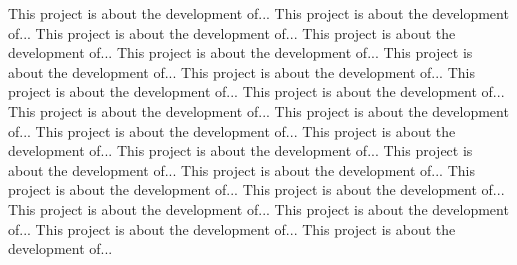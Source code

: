This project is about the development of...
This project is about the development of...
This project is about the development of...
This project is about the development of...
This project is about the development of...
This project is about the development of...
This project is about the development of...
This project is about the development of...
This project is about the development of...
This project is about the development of...
This project is about the development of...
This project is about the development of...
This project is about the development of...
This project is about the development of...
This project is about the development of...
This project is about the development of...
This project is about the development of...
This project is about the development of...
This project is about the development of...
This project is about the development of...
This project is about the development of...
This project is about the development of...